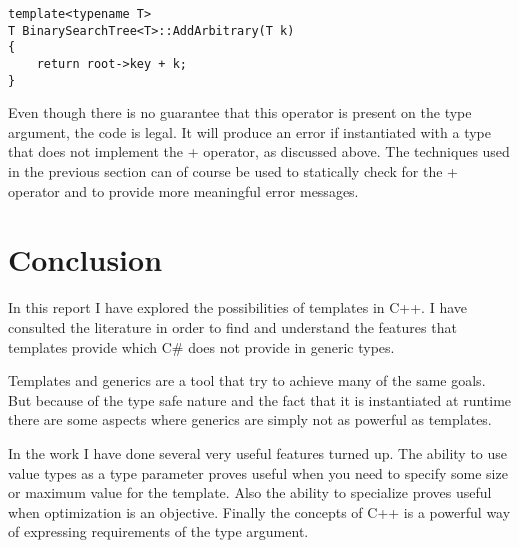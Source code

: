 \begin{lstlisting}
template<typename T>
T BinarySearchTree<T>::AddArbitrary(T k)
{
	return root->key + k;
}
\end{lstlisting}

Even though there is no guarantee that this operator is present on the type argument, the code is legal.
It will produce an error if instantiated with a type that does not implement the + operator, as discussed above.
The techniques used in the previous section can of course be used to statically check for the + operator and to provide more meaningful error messages.

\section{Conclusion}
In this report I have explored the possibilities of templates in C++.
I have consulted the literature in order to find and understand the features that templates provide which C\# does not provide in generic types.

Templates and generics are a tool that try to achieve many of the same goals.
But because of the type safe nature and the fact that it is instantiated at runtime there are some aspects where generics are simply not as powerful as templates.

In the work I have done several very useful features turned up.
The ability to use value types as a type parameter proves useful when you need to specify some size or maximum value for the template.
Also the ability to specialize proves useful when optimization is an objective.
Finally the concepts of C++ is a powerful way of expressing requirements of the type argument.





